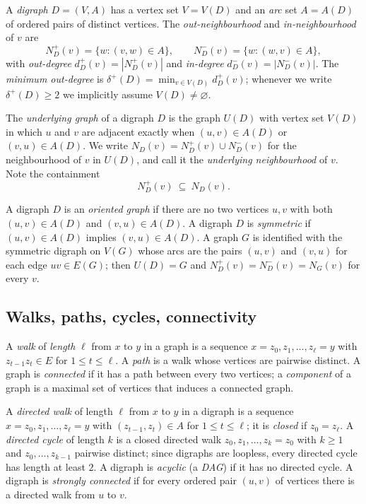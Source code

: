 \documentclass[11pt]{article}
\numberwithin{equation}{section}
\theoremstyle{plain}
\newcommand{\V}{V}
\newcommand{\A}{A}
\newcommand{\Np}{N^{+}}
\newcommand{\Nm}{N^{-}}
\newcommand{\dip}{d^{+}}
\newcommand{\dm}{d^{-}}
\newcommand{\dmin}{\delta^{+}}
\newcommand{\und}{U}                       %
\begin{document}
A \emph{digraph} $D=(\V,\A)$ has a vertex set $\V=\V(D)$ and an \emph{arc} set
$\A=\A(D)$ of ordered pairs of distinct vertices. The \emph{out-neighbourhood} and
\emph{in-neighbourhood} of $v$ are
\[
  \Np_D(v)=\{w:(v,w)\in\A\},\qquad \Nm_D(v)=\{w:(w,v)\in\A\},
\]
with \emph{out-degree} $\dip_D(v)=|\Np_D(v)|$ and \emph{in-degree}
$\dm_D(v)=|\Nm_D(v)|$. The \emph{minimum out-degree} is
$\dmin(D)=\min_{v\in\V(D)}\dip_D(v)$; whenever we write $\dmin(D)\ge 2$ we implicitly
assume $\V(D)\neq\varnothing$.

The \emph{underlying graph} of a digraph $D$ is the graph $\und(D)$ with vertex set
$\V(D)$ in which $u$ and $v$ are adjacent exactly when $(u,v)\in\A(D)$ or
$(v,u)\in\A(D)$. We write $N_D(v)=\Np_D(v)\cup\Nm_D(v)$ for the neighbourhood of $v$ in
$\und(D)$, and call it the \emph{underlying neighbourhood} of $v$. Note the containment
\begin{equation}\label{eq:contain}
  \Np_D(v)\ \subseteq\ N_D(v).
\end{equation}

A digraph $D$ is an \emph{oriented graph} if there are no two vertices $u,v$ with both
$(u,v)\in\A(D)$ and $(v,u)\in\A(D)$. A digraph $D$ is \emph{symmetric} if
$(u,v)\in\A(D)$ implies $(v,u)\in\A(D)$. A graph $G$ is identified with the symmetric
digraph on $\V(G)$ whose arcs are the pairs $(u,v)$ and $(v,u)$ for each edge $uv\in
E(G)$; then $\und(D)=G$ and $\Np_D(v)=\Nm_D(v)=N_G(v)$ for every $v$.

\subsection{Walks, paths, cycles, connectivity}

A \emph{walk} of \emph{length} $\ell$ from $x$ to $y$ in a graph is a sequence
$x=z_0,z_1,\dots,z_\ell=y$ with $z_{t-1}z_t\in E$ for $1\le t\le\ell$. A \emph{path} is a
walk whose vertices are pairwise distinct. A graph is \emph{connected} if it has a path
between every two vertices; a \emph{component} of a graph is a maximal set of vertices
that induces a connected graph.

A \emph{directed walk} of length $\ell$ from $x$ to $y$ in a digraph is a sequence
$x=z_0,z_1,\dots,z_\ell=y$ with $(z_{t-1},z_t)\in\A$ for $1\le t\le\ell$; it is
\emph{closed} if $z_0=z_\ell$. A \emph{directed cycle} of length $k$ is a closed directed
walk $z_0,z_1,\dots,z_k=z_0$ with $k\ge1$ and $z_0,\dots,z_{k-1}$ pairwise distinct;
since digraphs are loopless, every directed cycle has length at least $2$. A digraph is
\emph{acyclic} (a \emph{DAG}) if it has no directed cycle. A digraph is \emph{strongly
connected} if for every ordered pair $(u,v)$ of vertices there is a directed walk from
$u$ to $v$.
\end{document}
